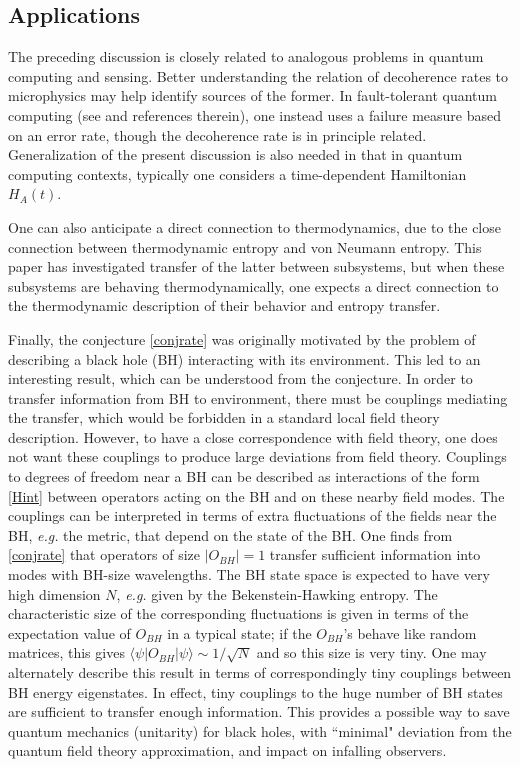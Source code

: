 \documentclass[aps,prd,groupedaddress,nofootinbib,letterpaper]{revtex4}
\begin{document}
\subsection{Applications}

The preceding discussion is closely related to analogous problems in quantum computing and sensing.  Better understanding the relation of decoherence rates to microphysics may help identify sources of the former.  In fault-tolerant quantum computing (see \cite{NgPr} and references therein), one instead uses a failure measure based on an error rate, though the decoherence rate is in principle related.  Generalization of the present discussion is also needed in that in quantum computing contexts, typically one considers a time-dependent Hamiltonian $H_A(t)$.

One can also anticipate a direct connection to thermodynamics, due to the close connection between thermodynamic entropy and von Neumann entropy.  This paper has investigated transfer of the latter between subsystems, but when these subsystems are behaving thermodynamically, one expects a direct connection to the thermodynamic description of their behavior and entropy transfer.

Finally, the conjecture \eqref{conjrate} was originally motivated by the problem of describing a black hole (BH) interacting with its environment.  This led to an interesting result\cite{NVU}, which can be understood from the conjecture.  In order to transfer information from BH to environment, there must be couplings mediating the transfer, which would be forbidden in a standard local field theory description.  However, to have a close correspondence with field theory, one does not want these couplings to produce large deviations from field theory.  Couplings to degrees of freedom near a BH can be described as interactions of the form \eqref{Hint} between operators acting on the BH and on these nearby field modes.  The couplings can be interpreted in terms of extra fluctuations of the fields near the BH, {\it e.g.} the metric, that depend on the state of the BH.  One finds\cite{NVU} from \eqref{conjrate} that operators of size $|O_{BH}|=1$ transfer sufficient information into modes with BH-size wavelengths.  The BH state space is expected to have very high dimension $N$, {\it e.g.} given by the Bekenstein-Hawking entropy.  The characteristic size of the corresponding fluctuations is given in terms of the expectation value of $O_{BH}$ in a typical state; if the $O_{BH}$'s behave like random matrices, this gives $\langle \psi|O_{BH}|\psi\rangle \sim 1/\sqrt N$ and so this size is very tiny.  One may alternately describe this result in terms of correspondingly tiny couplings between BH energy eigenstates.    In effect, tiny couplings to the huge number of BH states are sufficient to transfer enough information.  This provides a possible way to save quantum mechanics (unitarity) for black holes, with ``minimal" deviation from the quantum field theory approximation, and  impact on infalling observers\cite{NVU}.
\end{document}
